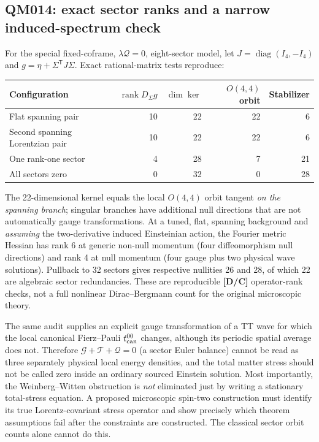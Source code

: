 \documentclass[11pt,a4paper]{article}
\begin{document}
\subsection{QM014: exact sector ranks and a narrow induced-spectrum check}\label{sec:v08-qm014}
For the special fixed-coframe, $\lambda\mathcal Q=0$, eight-sector model, let $J=\operatorname{diag}(I_4,-I_4)$ and $g=\eta+\Sigma^{\mathsf T}J\Sigma$. Exact rational-matrix tests reproduce:
\begin{center}\small
\begin{tabular}{@{}lrrrr@{}}\toprule
Configuration & $\operatorname{rank}D_\Sigma g$ & $\dim\ker$ & $O(4,4)$ orbit & Stabilizer\\\midrule
Flat spanning pair & 10 & 22 & 22 & 6\\
Second spanning Lorentzian pair & 10 & 22 & 22 & 6\\
One rank-one sector & 4 & 28 & 7 & 21\\
All sectors zero & 0 & 32 & 0 & 28\\\bottomrule
\end{tabular}
\end{center}
The 22-dimensional kernel equals the local $O(4,4)$ orbit tangent \emph{on the spanning branch}; singular branches have additional null directions that are not automatically gauge transformations. At a tuned, flat, spanning background and \emph{assuming} the two-derivative induced Einsteinian action, the Fourier metric Hessian has rank 6 at generic non-null momentum (four diffeomorphism null directions) and rank 4 at null momentum (four gauge plus two physical wave solutions). Pullback to 32 sectors gives respective nullities 26 and 28, of which 22 are algebraic sector redundancies. These are reproducible \textbf{[D/C]} operator-rank checks, not a full nonlinear Dirac--Bergmann count for the original microscopic theory.

The same audit supplies an explicit gauge transformation of a TT wave for which the local canonical Fierz--Pauli $t^{00}_{\rm can}$ changes, although its periodic spatial average does not. Therefore $\mathcal G+\mathcal T+\mathcal Q=0$ (a sector Euler balance) cannot be read as three separately physical local energy densities, and the total matter stress should not be called zero inside an ordinary sourced Einstein solution. Most importantly, the Weinberg--Witten obstruction is \emph{not} eliminated just by writing a stationary total-stress equation. A proposed microscopic spin-two construction must identify its true Lorentz-covariant stress operator and show precisely which theorem assumptions fail after the constraints are constructed. The classical sector orbit counts alone cannot do this.
\end{document}
